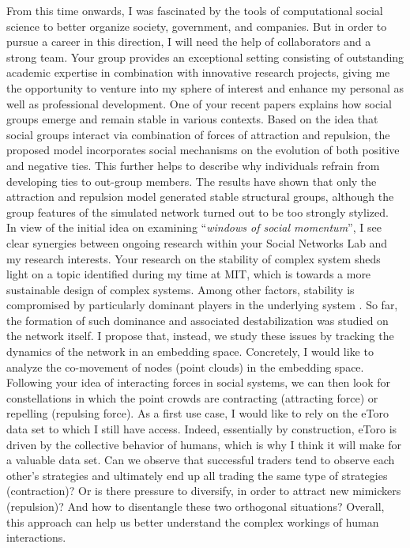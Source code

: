 From this time onwards, I was fascinated by the tools of computational social science to better organize society, government, and companies. 
But in order to pursue a career in this direction, I will need the help of collaborators and a strong team. 
Your group provides an exceptional setting consisting of outstanding academic expertise in combination with innovative research projects, giving me the opportunity to venture into my sphere of interest and enhance my personal as well as professional development.
One of your recent papers \cite{stadtfeld2020emergence} explains how social groups emerge and remain stable in various contexts.
Based on the idea that social groups interact via combination of forces of attraction and repulsion, the proposed model incorporates social mechanisms on the evolution of both positive and negative ties.
This further helps to describe why individuals refrain from developing ties to out-group members.
The results have shown that only the attraction and repulsion model generated stable structural groups, although the group features of the simulated network turned out to be too strongly stylized.
 \\

In view of the initial idea on examining ``\textit{windows of social momentum}'', I see clear synergies between ongoing research within your Social Networks Lab and my research interests. 
Your research on the stability of complex system sheds light on a topic identified during my time at MIT, which is towards a more sustainable design of complex systems.
Among other factors, stability is compromised by particularly dominant players in the underlying system \cite{lera2017prediction}.
So far, the formation of such dominance and associated destabilization was studied on the network itself. 
I propose that, instead, we study these issues by tracking the dynamics of the network in an embedding space. 
Concretely, I would like to analyze the co-movement of nodes (point clouds) in the embedding space. 
Following your idea of interacting forces in social systems, we can then look for constellations in which the point crowds are contracting (attracting force) or repelling (repulsing force). 
As a first use case, I would like to rely on the eToro data set to which I still have access. 
Indeed, essentially by construction, eToro is driven by the collective behavior of humans, which is why I think it will make for a valuable data set. 
Can we observe that successful traders tend to observe each other's strategies and ultimately end up all trading the same type of strategies (contraction)? 
Or is there pressure to diversify, in order to attract new mimickers (repulsion)? 
And how to disentangle these two orthogonal situations? 
Overall, this approach can help us better understand the complex workings of human interactions. 

